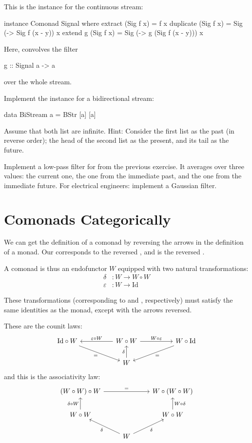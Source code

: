\documentclass[DaoFP]{subfiles}
\begin{document}
This is the  instance for the continuous stream:
\begin{haskell}
instance Comonad Signal where
  extract (Sig f x) = f x
  duplicate (Sig f x) = Sig (\y -> Sig f (x - y)) x
  extend g (Sig f x) = Sig (\y -> g (Sig f (x - y))) x
\end{haskell}
Here,  convolves the filter 
\begin{haskell}
g :: Signal a -> a
\end{haskell}
over the whole stream. 

\begin{exercise}
Implement the  instance for a bidirectional stream:
\begin{haskell}
data BiStream a = BStr [a] [a]
\end{haskell}
Assume that both list are infinite. Hint: Consider the first list as the past (in reverse order); the head of the second list as the present, and its tail as the future.
\end{exercise}

\begin{exercise}
Implement a low-pass filter for  from the previous exercise. It averages over three values: the current one, the one from the immediate past, and the one from the immediate future. For electrical engineers: implement a Gaussian filter. 
\end{exercise}

\section{Comonads Categorically}

We can get the definition of a comonad by reversing the arrows in the definition of a monad. Our  corresponds to the reversed , and  is the reversed . 


A comonad is thus an endofunctor $W$ equipped with two natural transformations:
\begin{align*}
\delta &\colon W \to W \circ W \\
\varepsilon &\colon W \to \text{Id} 
\end{align*}

These transformations (corresponding to  and , respectively) must satisfy the same identities as the monad, except with the arrows reversed. 

These are the counit laws:
\[
 \begin{tikzcd}
\text{Id} \circ W
 \arrow[rrd, "="']
& & W \circ W
 \arrow[ll, "\varepsilon \circ W"']
 \arrow[rr, "W \circ \varepsilon"]
&& W \circ \text{Id}
 \arrow[lld, "="]
 \\
 && W
  \arrow[u, "\delta"]
 \end{tikzcd}
\]
and this is the associativity law:
\[
 \begin{tikzcd}
 (W \circ W) \circ W 
 \arrow[rr, "="]
 &&
 W \circ (W \circ W)
 \\
 W \circ W 
 \arrow[u, "\delta \circ W"]
& & W \circ W
 \arrow[u, "W \circ \delta"']
 \\
&  W
 \arrow[ul, "\delta"]
 \arrow[ur, "\delta"']
 \end{tikzcd}
\]
\end{document}
